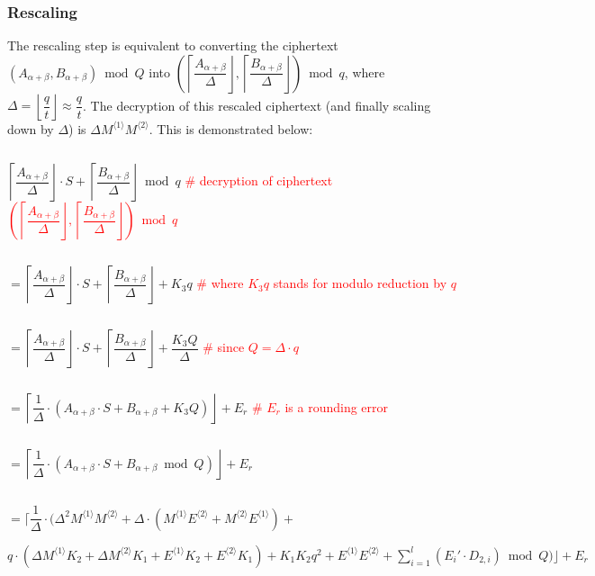 \subsubsection{Rescaling}
\label{subsubsec:bfv-mult-cipher-rescaling}

The rescaling step is equivalent to converting the ciphertext $(A_{\alpha+\beta}, B_{\alpha+\beta}) \bmod Q$ into $\left(\left\lceil\dfrac{A_{\alpha+\beta}}{\Delta}\right\rfloor, \left\lceil\dfrac{B_{\alpha+\beta}}{\Delta}\right\rfloor\right) \bmod q$, where $\Delta = \left\lfloor\dfrac{q}{t}\right\rfloor \approx \dfrac{q}{t}$. The decryption of this rescaled ciphertext (and finally scaling down by $\Delta$) is $\Delta M^{\langle 1 \rangle}M^{\langle 2 \rangle}$. This is demonstrated below: 

$ $

$ \left\lceil\dfrac{A_{\alpha+\beta}}{\Delta}\right\rfloor \cdot S + \left\lceil\dfrac{B_{\alpha+\beta}}{\Delta}\right\rfloor \bmod q$ \textcolor{red}{ \# decryption of ciphertext $\left(\left\lceil\dfrac{A_{\alpha+\beta}}{\Delta}\right\rfloor, \left\lceil\dfrac{B_{\alpha+\beta}}{\Delta}\right\rfloor\right) \bmod q$}

$ $

$ = \left\lceil\dfrac{A_{\alpha+\beta}}{\Delta}\right\rfloor \cdot S + \left\lceil\dfrac{B_{\alpha+\beta}}{\Delta}\right\rfloor + K_3q$ \textcolor{red}{ \# where $K_3q$ stands for modulo reduction by $q$}

$ $

$ = \left\lceil\dfrac{A_{\alpha+\beta}}{\Delta}\right\rfloor \cdot S + \left\lceil\dfrac{B_{\alpha+\beta}}{\Delta}\right\rfloor + \dfrac{K_3Q}{\Delta}$ \textcolor{red}{ \# since $Q = \Delta \cdot q$}


$ $

$ = \left\lceil\dfrac{1}{\Delta}\cdot (A_{\alpha+\beta}\cdot S + B_{\alpha+\beta} + K_3Q)\right\rfloor + E_r$ \textcolor{red}{ \# $E_r$ is a rounding error}

$ $

$ = \left\lceil\dfrac{1}{\Delta}\cdot (A_{\alpha+\beta}\cdot S + B_{\alpha+\beta} \bmod Q)\right\rfloor + E_r$ 

$ $

$ = \Bigg\lceil\dfrac{1}{\Delta}\cdot ( \Delta^2M^{\langle 1 \rangle}M^{\langle 2 \rangle} + \Delta\cdot (M^{\langle 1 \rangle}E^{\langle 2 \rangle} + M^{\langle 2 \rangle}E^{\langle 1 \rangle}) + $

\text{ } \text{ } $ q\cdot(\Delta M^{\langle 1 \rangle}K_2 + \Delta M^{\langle 2 \rangle}K_1 + E^{\langle 1 \rangle}K_2 + E^{\langle 2 \rangle}K_1) + K_1 K_2 q^2 + E^{\langle 1 \rangle} E^{\langle 2 \rangle} + \sum\limits_{i=1}^{l} (E_i'\cdot D_{2,i}) \bmod Q
)\Bigg\rfloor + E_r$

